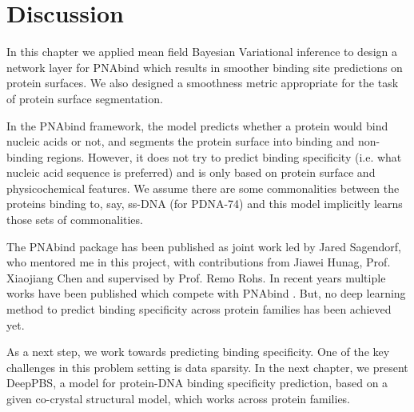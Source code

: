 \section{Discussion}
In this chapter we applied mean field Bayesian Variational inference to
design a network layer for PNAbind which results in smoother binding site predictions on protein surfaces. We also designed a smoothness metric appropriate for the task of protein surface segmentation.

In the PNAbind framework, the model predicts whether a protein would bind nucleic acids or not, and segments the protein surface into binding and non-binding regions. However, it does not try to predict binding specificity (i.e. what nucleic acid sequence is preferred) and is only based on protein surface and physicochemical features. We assume there are some commonalities between the proteins binding to, say, ss-DNA (for PDNA-74) and this model implicitly learns those sets of commonalities. 

The PNAbind package has been published as joint work led by Jared Sagendorf, who mentored me in this project, with contributions from Jiawei Hunag, Prof. Xiaojiang Chen and supervised by Prof. Remo Rohs\citep{Sagendorf2024}. In recent years multiple works have been published which compete with PNAbind \citep{gainza2020deciphering, gligorijevic2021structure, yuan2022alphafold2, xia2021graphbind, tubiana2022scannet, krapp2023pesto, li2023geobind, sverrisson2021fast}. But, no deep learning method to predict binding specificity across protein families has been achieved yet.

As a next step, we work towards predicting binding specificity. One of the key challenges in this problem setting is data sparsity. In the next chapter, we present DeepPBS, a model for protein-DNA binding specificity prediction, based on a given co-crystal structural model, which works across protein families.  
